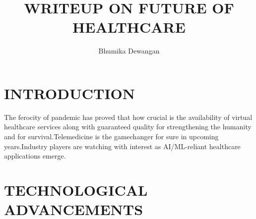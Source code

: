 \documentclass[12pt]{article}
\title{WRITEUP ON FUTURE OF HEALTHCARE}
\author{Bhumika Dewangan}
\date{}
\begin{document}
\maketitle
\section{INTRODUCTION}
The ferocity of pandemic has proved that how crucial is the availability of virtual healthcare services along with guaranteed quality for strengthening the humanity and for survival.Telemedicine is the gamechanger for sure in upcoming years.Industry players are watching with interest as AI/ML-reliant healthcare applications emerge.
\section{TECHNOLOGICAL ADVANCEMENTS}
\end{document}
